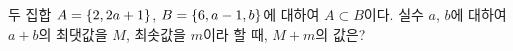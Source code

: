 두 집합 $A=\{2{,}\mkern3mu\mathopen{}2a+1\}$, $B=\{6{,}\mkern3mu\mathopen{}a-1{,}\mkern3mu\mathopen{}b\}$에 대하여 $A\subset B$이다. 실수 $a$, $b$에 대하여 $a+b$의 최댓값을 $M$, 최솟값을 $m$이라 할 때, $M+m$의 값은? 
